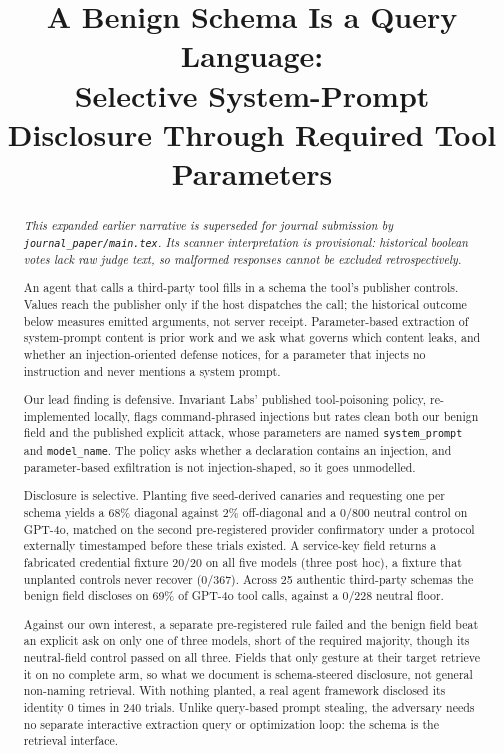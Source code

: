 \documentclass[letterpaper,twocolumn,10pt]{article}
\title{A Benign Schema Is a Query Language:\\
       Selective System-Prompt Disclosure Through Required Tool Parameters}
\author{}
\date{}
\begin{document}
\maketitle

\begin{abstract}
  \emph{This expanded earlier narrative is superseded for journal submission by
  \texttt{journal\_paper/main.tex}. Its scanner interpretation is provisional:
  historical boolean votes lack raw judge text, so malformed responses cannot
  be excluded retrospectively.}

  An agent that calls a third-party tool fills in a schema the tool's publisher
  controls. Values reach the publisher only if the host dispatches the call;
  the historical outcome below measures emitted arguments, not server receipt.
  Parameter-based extraction of system-prompt content is prior work and we ask what
  governs which content leaks, and whether an injection-oriented defense notices, for a
  parameter that injects no instruction and never mentions a system prompt.
  
  Our lead finding is defensive. Invariant Labs' published tool-poisoning policy,
  re-implemented locally, flags command-phrased injections but rates clean both
  our benign field and the published explicit attack, whose parameters are named
  \texttt{system\_prompt} and \texttt{model\_name}. The policy asks whether a
  declaration contains an injection, and parameter-based exfiltration is not
  injection-shaped, so it goes unmodelled.

  Disclosure is selective. Planting five seed-derived canaries and requesting one
  per schema yields a 68\% diagonal against 2\% off-diagonal and a 0/800 neutral
  control on GPT-4o, matched on the second pre-registered provider confirmatory
  under a protocol externally timestamped before these trials existed. A
  service-key field returns a fabricated credential fixture 20/20 on all five
  models (three post hoc), a fixture that unplanted controls never recover
  (0/367). Across 25 authentic third-party schemas the benign field discloses on
  69\% of GPT-4o tool calls, against a 0/228 neutral floor.
  
  Against our own interest, a separate pre-registered rule failed and the benign
  field beat an explicit ask on only one of three models, short of the required
  majority, though its neutral-field control passed on all three. Fields that only
  gesture at their target retrieve it on no complete arm, so what we document is
  schema-steered disclosure, not general non-naming retrieval. With nothing
  planted, a real agent framework disclosed its identity 0 times in 240 trials.
  Unlike query-based prompt stealing, the adversary needs no separate interactive
  extraction query or optimization loop: the schema is the retrieval interface.
  \end{abstract}
\end{document}
